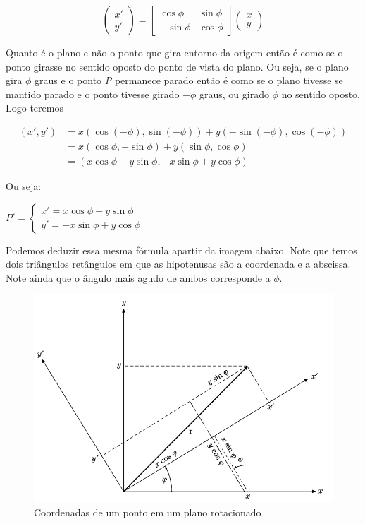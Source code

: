 $$\left( \begin{matrix} x' \\ y' \end{matrix} \right)=\begin{bmatrix} \cos \phi & \sin \phi \\ -\sin \phi  & \cos \phi \end{bmatrix}\left( \begin{matrix} x \\ y \end{matrix} \right) $$

Quanto é o plano e não o ponto que gira entorno da origem então é como se o ponto girasse no sentido oposto do ponto de vista do plano. Ou seja, se o plano gira $\phi$ graus e o ponto \textit{P} permanece parado então é como se o plano tivesse se mantido parado e o ponto tivesse girado $-\phi$ graus, ou girado $\phi$ no sentido oposto. Logo teremos

\begin{equation}\label{6.4}
\begin{split}
    (x',y')&=x(\cos (-\phi) , \sin (-\phi))+y(-\sin (-\phi) , \cos (-\phi))\\
    &=x(\cos \phi , -\sin \phi)+y(\sin \phi , \cos \phi)\\
    &=(x\cos \phi + y\sin \phi,- x \sin \phi + y \cos \phi )
    \end{split}
\end{equation}

Ou seja:

\begin{center}
$ P'= \begin{cases}
x'=x\cos \phi + y\sin \phi \\ 
y'=- x \sin \phi + y \cos \phi
\end{cases}$
\end{center}

Podemos deduzir essa mesma fórmula apartir da imagem abaixo. Note que temos dois triângulos retângulos em que as hipotenusas são a coordenada e a abscissa.  Note ainda que o ângulo mais agudo de ambos corresponde a $\phi$. 

\begin{figure}[h]
    \centering
    \includegraphics[scale=.5]{./imagens/09.png}
    \caption{Coordenadas de um ponto em um plano rotacionado}
    \label{fig:my_label}
\end{figure}


